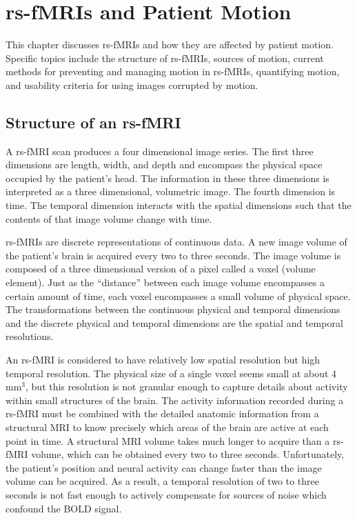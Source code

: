 \chapter{rs-fMRIs and Patient Motion}
\label{ch:mri}

This chapter discusses rs-fMRIs and how they are affected by patient motion. Specific topics include the structure of rs-fMRIs, sources of motion, current methods for preventing and managing motion in rs-fMRIs, quantifying motion, and usability criteria for using images corrupted by motion.

\section{Structure of an rs-fMRI}

A rs-fMRI scan produces a four dimensional image series. The first three dimensions are length, width, and depth and encompass the physical space occupied by the patient's head. The information in these three dimensions is interpreted as a three dimensional, volumetric image. The fourth dimension is time. The temporal dimension interacts with the spatial dimensions such that the contents of that image volume change with time.

rs-fMRIs are discrete representations of continuous data. A new image volume of the patient's brain is acquired every two to three seconds. The image volume is composed of a three dimensional version of a pixel called a voxel (volume element). Just as the ``distance'' between each image volume encompasses a certain amount of time, each voxel encompasses a small volume of physical space. The transformations between the continuous physical and temporal dimensions and the discrete physical and temporal dimensions are the spatial and temporal resolutions. 

An rs-fMRI is considered to have relatively low spatial resolution but high temporal resolution. The physical size of a single voxel seems small at about 4 mm$^3$, but this resolution is not granular enough to capture details about activity within small structures of the brain. The activity information recorded during a rs-fMRI must be combined with the detailed anatomic information from a structural MRI to know precisely which areas of the brain are active at each point in time. A structural MRI volume takes much longer to acquire than a rs-fMRI volume, which can be obtained every two to three seconds. Unfortunately, the patient's position and neural activity can change faster than the image volume can be acquired. As a result, a temporal resolution of two to three seconds is not fast enough to actively compensate for sources of noise which confound the BOLD signal. 

